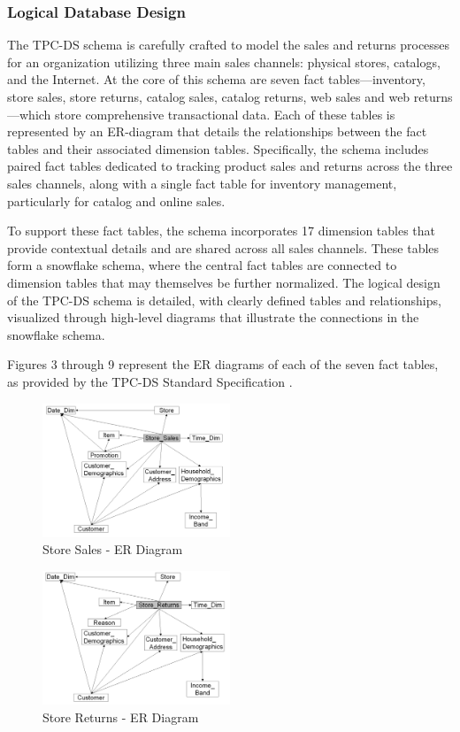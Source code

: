 \documentclass[conference]{IEEEtran}
\begin{document}
\subsubsection{Logical Database Design}

The TPC-DS schema is carefully crafted to model the sales and returns processes for an organization utilizing three main sales channels:
physical stores, catalogs, and the Internet. At the core of this schema are seven fact tables—inventory, store sales, store returns,
catalog sales, catalog returns, web sales and web returns—which store comprehensive transactional data. Each of these tables is represented
by an ER-diagram that details the relationships between the fact tables and their associated dimension tables. Specifically, the schema
includes paired fact tables dedicated to tracking product sales and returns across the three sales channels, along with a single fact table
for inventory management, particularly for catalog and online sales.

To support these fact tables, the schema incorporates 17 dimension tables that provide contextual details and are shared across all sales channels.
These tables form a snowflake schema, where the central fact tables are connected to dimension tables that may themselves be further normalized.
The logical design of the TPC-DS schema is detailed, with clearly defined tables and relationships, visualized through high-level diagrams that
illustrate the connections in the snowflake schema.

Figures 3 through 9 represent the ER diagrams of each of the seven fact tables, as provided by the TPC-DS Standard Specification \cite{b8}.

\begin{figure}[h]
    \centering
    \includegraphics[width=0.5\textwidth]{images/ER_Diagrams/Store Sales - ER Diagram.png}
    \caption{Store Sales - ER Diagram}
    \label{fig:store_sales_er_diagram}
\end{figure}

\begin{figure}[h]
    \centering
    \includegraphics[width=0.5\textwidth]{images/ER_Diagrams/Store Returns - ER Diagram.png}
    \caption{Store Returns - ER Diagram}
    \label{fig:store_returns_er_diagram}
\end{figure}
\end{document}
